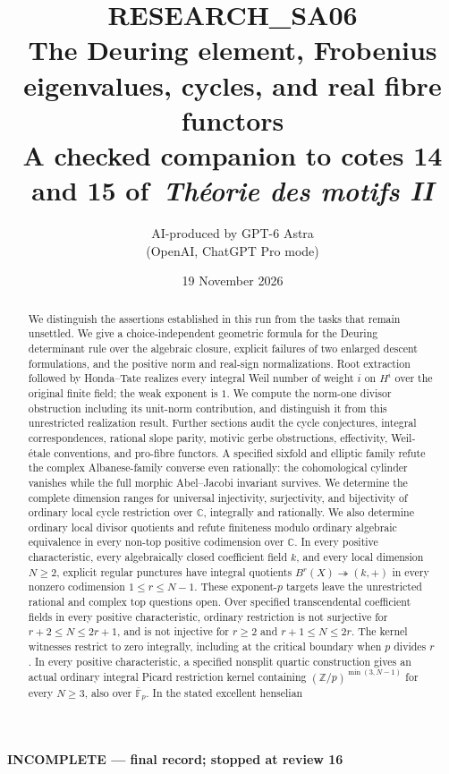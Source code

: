 \documentclass[11pt,a4paper]{article}
\title{\textbf{RESEARCH\_SA06}\\[5pt]
The Deuring element, Frobenius eigenvalues, cycles, and real fibre functors\\[5pt]
\large A checked companion to cotes 14 and 15 of\
\emph{Théorie des motifs II}}
\author{AI-produced by GPT-6 Astra\\(OpenAI, ChatGPT Pro mode)}
\date{19 November 2026}
\begin{document}
\maketitle
\begin{center}\textbf{INCOMPLETE --- final record; stopped at review 16}\end{center}
\begin{abstract}
We distinguish the assertions established in this run from the tasks that
remain unsettled. We give a choice-independent geometric formula for the
Deuring determinant rule over the algebraic closure, explicit failures of
two enlarged descent formulations, and the positive norm and real-sign
normalizations. Root extraction followed by Honda--Tate realizes every
integral Weil number of weight $i$ on $H^i$ over the original finite field;
the weak exponent is $1$. We compute the norm-one divisor obstruction
including its unit-norm contribution, and distinguish it from this
unrestricted realization result. Further sections audit the cycle
conjectures, integral correspondences, rational slope parity, motivic
gerbe obstructions, effectivity, Weil-étale conventions, and pro-fibre
functors. A specified sixfold and elliptic family refute the complex
Albanese-family converse even rationally: the cohomological cylinder
vanishes while the full morphic Abel--Jacobi invariant survives.
We determine the complete dimension ranges for universal injectivity,
surjectivity, and bijectivity of ordinary local cycle restriction over
$\mathbb C$, integrally and rationally. We also determine ordinary local
divisor quotients and refute finiteness modulo ordinary algebraic
equivalence in every non-top positive codimension over $\mathbb C$.
In every positive characteristic, every algebraically closed coefficient
field $k$, and every local dimension $N\ge2$, explicit regular punctures
have integral quotients $B^r(X)\twoheadrightarrow(k,+)$ in every
nonzero codimension $1\le r\le N-1$. These exponent-$p$ targets leave the
unrestricted rational and complex top questions open.
Over specified transcendental coefficient fields in every positive
characteristic, ordinary restriction is not surjective for
$r+2\le N\le2r+1$, and is not injective for $r\ge2$ and
$r+1\le N\le2r$. The kernel witnesses restrict to zero integrally,
including at the critical boundary when $p$ divides $r$.
In every positive characteristic, a specified nonsplit quartic construction
gives an actual ordinary integral Picard restriction kernel containing
$(\mathbb Z/p)^{\min(3,N-1)}$ for every $N\ge3$, also over
$\overline{\mathbb F}_p$. In the stated excellent henselian

\end{abstract}
\end{document}
